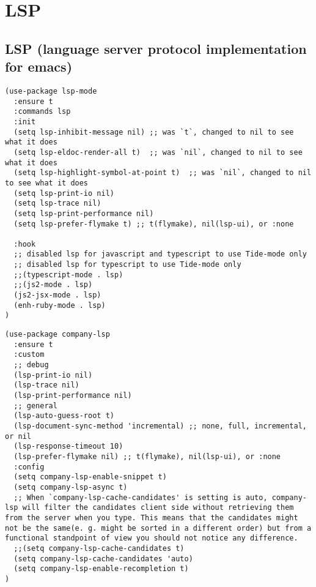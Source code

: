\documentclass[11pt]{article}
\begin{document}
\section*{LSP}
\label{sec:orgc32415b}

\subsection*{LSP (language server protocol implementation for emacs)}
\label{sec:orgef7fddc}

\begin{verbatim}
(use-package lsp-mode
  :ensure t
  :commands lsp
  :init
  (setq lsp-inhibit-message nil) ;; was `t`, changed to nil to see what it does
  (setq lsp-eldoc-render-all t)  ;; was `nil`, changed to nil to see what it does
  (setq lsp-highlight-symbol-at-point t)  ;; was `nil`, changed to nil to see what it does
  (setq lsp-print-io nil)
  (setq lsp-trace nil)
  (setq lsp-print-performance nil)
  (setq lsp-prefer-flymake t) ;; t(flymake), nil(lsp-ui), or :none

  :hook
  ;; disabled lsp for javascript and typescript to use Tide-mode only
  ;; disabled lsp for typescript to use Tide-mode only
  ;;(typescript-mode . lsp)
  ;;(js2-mode . lsp)
  (js2-jsx-mode . lsp)
  (enh-ruby-mode . lsp)
)

\end{verbatim}

\begin{verbatim}
(use-package company-lsp
  :ensure t
  :custom
  ;; debug
  (lsp-print-io nil)
  (lsp-trace nil)
  (lsp-print-performance nil)
  ;; general
  (lsp-auto-guess-root t)
  (lsp-document-sync-method 'incremental) ;; none, full, incremental, or nil
  (lsp-response-timeout 10)
  (lsp-prefer-flymake nil) ;; t(flymake), nil(lsp-ui), or :none
  :config
  (setq company-lsp-enable-snippet t)
  (setq company-lsp-async t)
  ;; When `company-lsp-cache-candidates' is setting is auto, company-lsp will filter the candidates client side without retrieving them from the server when you type. This means that the candidates might not be the same(e. g. might be sorted in a different order) but from a functional standpoint of view you should not notice any difference.
  ;;(setq company-lsp-cache-candidates t)
  (setq company-lsp-cache-candidates 'auto)
  (setq company-lsp-enable-recompletion t)
)
\end{verbatim}
\end{document}
